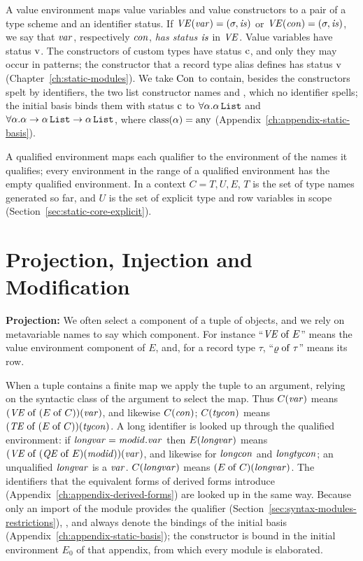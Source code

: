 A value environment maps value variables and value constructors to a pair of a
type scheme and an identifier status. If $\mathit{VE}(\mathit{var}) = (\sigma, \mathit{is})$ or
$\mathit{VE}(\mathit{con}) = (\sigma, \mathit{is})$, we say that $\mathit{var}$, respectively $\mathit{con}$, \emph{has
status} $\mathit{is}$ in $\mathit{VE}$. Value variables have status $\mathrm{v}$. The constructors of
custom types have status $\mathrm{c}$, and only they may occur in patterns; the
constructor that a record type alias defines has status $\mathrm{v}$
(Chapter~\ref{ch:static-modules}). We take $\mathrm{Con}$ to contain, besides
the constructors spelt by identifiers, the two list constructor names \kw{[]}
and \kw{::}, which no identifier spells; the initial basis binds them with
status $\mathrm{c}$ to $\forall\alpha.\alpha\,\mathtt{List}$ and $\forall\alpha.\alpha
\rightarrow \alpha\,\mathtt{List} \rightarrow \alpha\,\mathtt{List}$, where $\mathrm{class}(\alpha) =
\mathrm{any}$ (Appendix~\ref{ch:appendix-static-basis}).

A qualified environment maps each qualifier to the environment of the names it
qualifies; every environment in the range of a qualified environment has the
empty qualified environment. In a context $C = T, U, E$, $T$ is the set of type
names generated so far, and $U$ is the set of explicit type and row variables in
scope (Section~\ref{sec:static-core-explicit}).

\section{Projection, Injection and Modification}\label{sec:static-core-projection}

\textbf{Projection:} We often select a component of a tuple of objects, and we
rely on metavariable names to say which component. For instance ``$\mathit{VE} \mathrel{\mathrm{of}}
E$'' means the value environment component of $E$, and, for a record type
$\tau$, ``$\varrho \mathrel{\mathrm{of}} \tau$'' means its row.

When a tuple contains a finite map we apply the tuple to an argument, relying
on the syntactic class of the argument to select the map. Thus $C(\mathit{var})$ means
$(\mathit{VE} \mathrel{\mathrm{of}} (E \mathrel{\mathrm{of}} C))(\mathit{var})$, and likewise $C(\mathit{con})$; $C(\mathit{tycon})$
means $(\mathit{TE} \mathrel{\mathrm{of}} (E \mathrel{\mathrm{of}} C))(\mathit{tycon})$. A long identifier is looked up through the
qualified environment: if $\mathit{longvar} = \mathit{modid}.\mathit{var}$ then $E(\mathit{longvar})$ means
$(\mathit{VE} \mathrel{\mathrm{of}} (\mathit{QE} \mathrel{\mathrm{of}} E)(\mathit{modid}))(\mathit{var})$, and likewise for $\mathit{longcon}$ and
$\mathit{longtycon}$; an unqualified $\mathit{longvar}$ is a $\mathit{var}$. $C(\mathit{longvar})$ means $(E
\mathrel{\mathrm{of}} C)(\mathit{longvar})$. The identifiers that the equivalent forms of derived forms
introduce (Appendix~\ref{ch:appendix-derived-forms}) are looked up in the same
way. Because only an import of the module  provides the qualifier
 (Section~\ref{sec:syntax-modules-restrictions}), ,
 and  always denote the bindings of the
initial basis (Appendix~\ref{ch:appendix-static-basis}); the constructor
\kw{::} is bound in the initial environment $E_0$ of that appendix, from which
every module is elaborated. %

